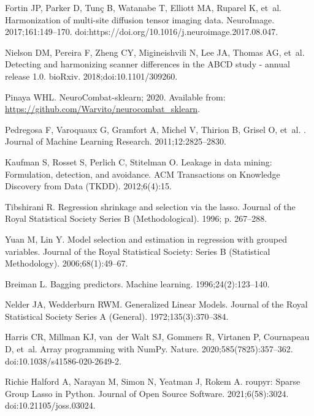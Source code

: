 \documentclass[10pt,letterpaper]{article}
\begin{document}
\begin{thebibliography}{100}
Fortin JP, Parker D, Tunç B, Watanabe T, Elliott MA, Ruparel K, et~al.
\newblock Harmonization of multi-site diffusion tensor imaging data.
\newblock NeuroImage. 2017;161:149--170.
\newblock doi:{https://doi.org/10.1016/j.neuroimage.2017.08.047}.

Nielson DM, Pereira F, Zheng CY, Migineishvili N, Lee JA, Thomas AG, et~al.
\newblock Detecting and harmonizing scanner differences in the ABCD study -
  annual release 1.0.
\newblock bioRxiv. 2018;doi:{10.1101/309260}.

Pinaya WHL. NeuroCombat-sklearn; 2020.
\newblock Available from: \url{https://github.com/Warvito/neurocombat_sklearn}.

Pedregosa F, Varoquaux G, Gramfort A, Michel V, Thirion B, Grisel O, et~al.
.
\newblock Journal of Machine Learning Research. 2011;12:2825--2830.

Kaufman S, Rosset S, Perlich C, Stitelman O.
\newblock Leakage in data mining: Formulation, detection, and avoidance.
\newblock ACM Transactions on Knowledge Discovery from Data (TKDD).
  2012;6(4):15.

Tibshirani R.
\newblock Regression shrinkage and selection via the lasso.
\newblock Journal of the Royal Statistical Society Series B (Methodological).
  1996; p. 267--288.

Yuan M, Lin Y.
\newblock Model selection and estimation in regression with grouped variables.
\newblock Journal of the Royal Statistical Society: Series B (Statistical
  Methodology). 2006;68(1):49--67.

Breiman L.
\newblock Bagging predictors.
\newblock Machine learning. 1996;24(2):123--140.

Nelder JA, Wedderburn RWM.
\newblock Generalized Linear Models.
\newblock Journal of the Royal Statistical Society Series A (General).
  1972;135(3):370--384.

Harris CR, Millman KJ, van~der Walt SJ, Gommers R, Virtanen P, Cournapeau D,
  et~al.
\newblock Array programming with {NumPy}.
\newblock Nature. 2020;585(7825):357--362.
\newblock doi:{10.1038/s41586-020-2649-2}.

{R}ichie {H}alford A, Narayan M, Simon N, Yeatman J, Rokem A.
roupyr: {S}parse {G}roup {L}asso in {P}ython.
\newblock Journal of Open Source Software. 2021;6(58):3024.
\newblock doi:{10.21105/joss.03024}.


\end{thebibliography}
\end{document}
